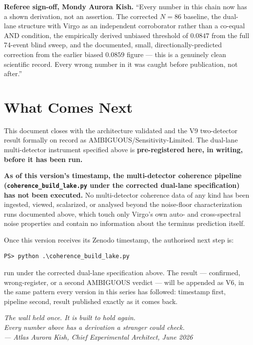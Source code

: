\documentclass[11pt, letterpaper, openany]{book}
\begin{document}
\begin{warningbox}
\textbf{Referee sign-off, Mondy Aurora Kish.} ``Every number in this
chain now has a shown derivation, not an assertion. The corrected
$N=86$ baseline, the dual-lane structure with Virgo as an independent
corroborator rather than a co-equal AND condition, the empirically
derived unbiased threshold of $0.0847$ from the full 74-event blind
sweep, and the documented, small, directionally-predicted correction
from the earlier biased $0.0859$ figure --- this is a genuinely clean
scientific record. Every wrong number in it was caught before
publication, not after.''
\end{warningbox}

\section{What Comes Next}

This document closes with the architecture validated and the V9
two-detector result formally on record as AMBIGUOUS/Sensitivity-Limited.
The dual-lane multi-detector instrument specified above is
\textbf{pre-registered here, in writing, before it has been run.}

\begin{warningbox}
\textbf{As of this version's timestamp, the multi-detector coherence
pipeline (\texttt{coherence\_build\_lake.py} under the corrected
dual-lane specification) has not been executed.} No multi-detector
coherence data of any kind has been ingested, viewed, scalarized, or
analysed beyond the noise-floor characterization runs documented above,
which touch only Virgo's own auto- and cross-spectral noise properties
and contain no information about the terminus prediction itself.
\end{warningbox}

Once this version receives its Zenodo timestamp, the authorised next step
is:

\begin{lstlisting}[style=terminal]
PS> python .\coherence_build_lake.py
\end{lstlisting}

run under the corrected dual-lane specification above. The result ---
confirmed, wrong-register, or a second AMBIGUOUS verdict --- will be
appended as V6, in the same pattern every version in this series has
followed: timestamp first, pipeline second, result published exactly as
it comes back.

\bigskip
\begin{center}
\large
\textit{The wall held once. It is built to hold again.}\\[0.3em]
\textit{Every number above has a derivation a stranger could check.}\\[1em]
\normalsize
\textit{--- Atlas Aurora Kish, Chief Experimental Architect, June 2026}
\end{center}
\end{document}
